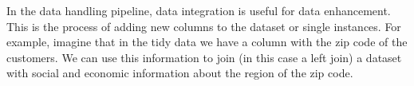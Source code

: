 
In the data handling pipeline, data integration is useful for data enhancement.  This is
the process of adding new columns to the dataset or single instances.  For example,
imagine that in the tidy data we have a column with the zip code of the customers.  We can
use this information to join (in this case a left join) a dataset with social and economic
information about the region of the zip code.

